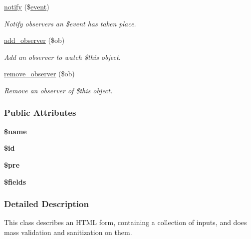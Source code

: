 \begin{DoxyCompactItemize}
\hyperlink{classforms_a82bc2b5e603ecd535f362c3dfdcae96e}{notify} (\$\hyperlink{classevent}{event})
\begin{DoxyCompactList}\small\item\em Notify observers an \$event has taken place. \end{DoxyCompactList}\item 
\hyperlink{classforms_a6c88ab2728699cc06ba8110b1f5aacbc}{add\-\_\-observer} (\$ob)
\begin{DoxyCompactList}\small\item\em Add an observer to watch \$this object. \end{DoxyCompactList}\item 
\hyperlink{classforms_af5c72c905909819f8824958c2faa015d}{remove\-\_\-observer} (\$ob)
\begin{DoxyCompactList}\small\item\em Remove an observer of \$this object. \end{DoxyCompactList}\end{DoxyCompactItemize}
\subsubsection*{Public Attributes}
\begin{DoxyCompactItemize}
\item 
\hypertarget{classforms_aa84609327e0f9bdf2ba799c8cd2268fd}{{\bfseries \$name}}\label{classforms_aa84609327e0f9bdf2ba799c8cd2268fd}

\item 
\hypertarget{classforms_a43144384180122ef4434845671a45e4c}{{\bfseries \$id}}\label{classforms_a43144384180122ef4434845671a45e4c}

\item 
\hypertarget{classforms_a55665dfe896e78efdfd33a650f6e2d7c}{{\bfseries \$pre}}\label{classforms_a55665dfe896e78efdfd33a650f6e2d7c}

\item 
\hypertarget{classforms_a4df40ac2adbfb971665ab358fc8954b5}{{\bfseries \$fields}}\label{classforms_a4df40ac2adbfb971665ab358fc8954b5}

\end{DoxyCompactItemize}


\subsubsection{Detailed Description}
This class describes an H\-T\-M\-L form, containing a collection of inputs, and does mass validation and sanitization on them. 

